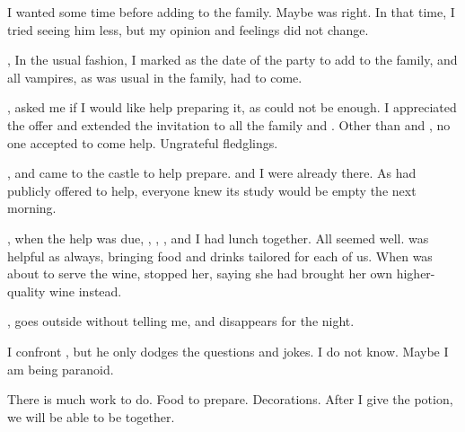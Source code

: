 {I wanted some time before adding  to the family. Maybe  was right. In that time, I tried seeing him less, but my opinion and feelings did not change.

, In the usual fashion, I marked  as the date of the party to add  to the family, and all vampires, as was usual in the family, had to come.

,  asked me if I would like help preparing it, as  could not be enough. I appreciated the offer and extended the invitation to all the family and . Other than   and , no one accepted to come help. Ungrateful fledglings.

,  and  came to the castle to help prepare.  and I were already there. As  had publicly offered to help, everyone knew its study would be empty the next morning.

, when the help was due, , , , and I had lunch together. All seemed well.  was helpful as always, bringing food and drinks tailored for each of us. When  was about to serve the wine,  stopped her, saying she had brought her own higher-quality wine instead.

,  goes outside without telling me, and disappears for the night.

 I confront , but he only dodges the questions and jokes. I do not know. Maybe I am being paranoid.

There is much work to do. Food to prepare. Decorations. After I give  the potion, we will be able to be together.

}
